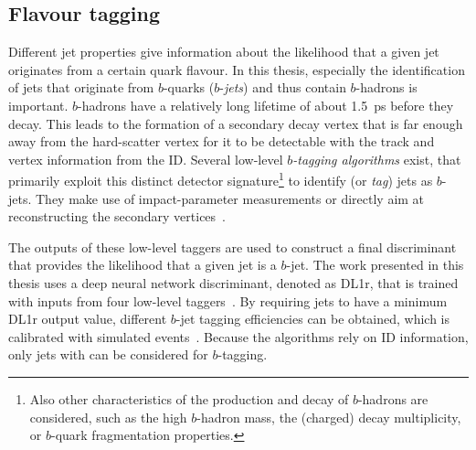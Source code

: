 \subsection{Flavour tagging}
Different jet properties give information about the likelihood that a given jet originates from a certain quark flavour.
In this thesis, especially the identification of jets that originate from $b$-quarks ($b$-\emph{jets}) and thus contain $b$-hadrons is important. $b$-hadrons have a relatively long lifetime of about \SI{1.5}{\pico\second} before they decay. This leads to the formation of a secondary decay vertex that is far enough away from the hard-scatter vertex for it to be detectable with the track and vertex information from the ID.
Several low-level \emph{$b$-tagging algorithms} exist, that primarily exploit this distinct detector signature\footnote{Also other characteristics of the production and decay of $b$-hadrons are considered, such as the high $b$-hadron mass, the (charged) decay multiplicity, or $b$-quark fragmentation properties.} to identify (or \emph{tag}) jets as $b$-jets. They make use of impact-parameter measurements or directly aim at reconstructing the secondary vertices~\cite{ATL-PHYS-PUB-2017-013}.

The outputs of these low-level taggers are used to construct a final discriminant that provides the likelihood that a given jet is a $b$-jet. The work presented in this thesis uses a deep neural network discriminant, denoted as DL1r, that is trained with inputs from four low-level taggers~\cite{ATL-PHYS-PUB-2017-013}.
By requiring jets to have a minimum DL1r output value, different $b$-jet tagging efficiencies can be obtained, which is calibrated with simulated \ttbar events~\cite{FTAG-2018-01}.
Because the algorithms rely on ID information, only jets with  can be considered for $b$-tagging.



